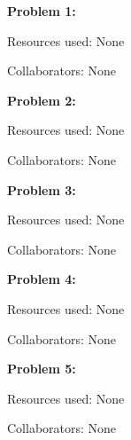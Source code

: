 \documentclass[11pt,largemargins]{homework}
\begin{document}
\maketitle

\newpage
\setcounter{questionCounter}{-1}
\question
\textbf{Problem 1:} 

Resources used: None

Collaborators: None

\textbf{Problem 2:} 

Resources used: None

Collaborators: None

\textbf{Problem 3:} 

Resources used: None

Collaborators: None

\textbf{Problem 4:} 

Resources used: None

Collaborators: None

\textbf{Problem 5:} 

Resources used: None

Collaborators: None
\end{document}
